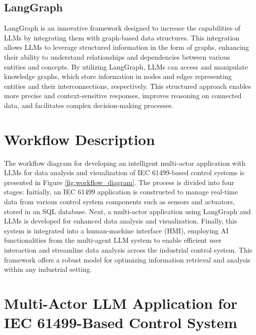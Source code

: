 \documentclass[conference]{IEEEtran}
\begin{document}
\subsection{LangGraph}

LangGraph \cite{langchainailanggraph2023} is an innovative framework designed to increase the capabilities of LLMs by integrating them with graph-based data structures. This integration allows LLMs to leverage structured information in the form of graphs, enhancing their ability to understand relationships and dependencies between various entities and concepts. By utilizing LangGraph, LLMs can access and manipulate knowledge graphs, which store information in nodes and edges representing entities and their interconnections, respectively. This structured approach enables more precise and context-sensitive responses, improves reasoning on connected data, and facilitates complex decision-making processes.



\section{Workflow Description}

The workflow diagram for developing an intelligent multi-actor application with LLMs for data analysis and visualization of IEC 61499-based control systems is presented in Figure \ref{fig:workflow_diagram}. The process is divided into four stages: Initially, an IEC 61499 application is constructed to manage real-time data from various control system components such as sensors and actuators, stored in an SQL database. Next, a multi-actor application using LangGraph and LLMs is developed for enhanced data analysis and visualization. Finally, this system is integrated into a human-machine interface (HMI), employing AI functionalities from the multi-agent LLM system to enable efficient user interaction and streamline data analysis across the industrial control system. This framework offers a robust model for optimizing information retrieval and analysis within any industrial setting.


\section{ Multi-Actor LLM Application for IEC 61499-Based Control System}
\label{sec:methodology}
\end{document}
